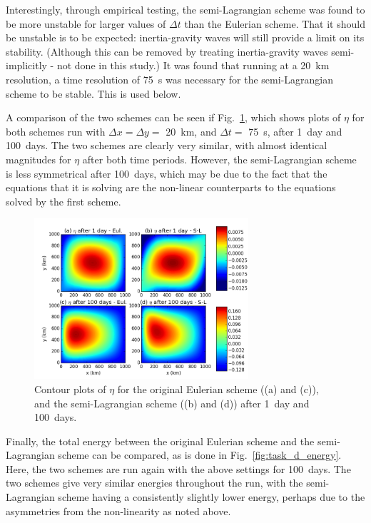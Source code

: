 \documentclass{article}
\begin{document}
Interestingly, through empirical testing, the semi-Lagrangian scheme was found to be more unstable
for larger values of $\Delta t$ than the Eulerian scheme. That it should be unstable is to be
expected: inertia-gravity waves will still provide a limit on its stability. (Although this can be
removed by treating inertia-gravity waves semi-implicitly - not done in this study.) It was found
that running at a \SI{20}{km} resolution, a time resolution of \SI{75}{s} was necessary for the
semi-Lagrangian scheme to be stable. This is used below.

A comparison of the two schemes can be seen if Fig.\ \ref{fig:task_d_eta}, which shows plots of
$\eta$ for both schemes run with $\Delta x = \Delta y = $ \SI{20}{km}, and $\Delta t = $
\SI{75}{s}, after \SI{1}{day} and \SI{100}{days}. The two schemes are clearly very similar, with
almost identical magnitudes for $\eta$ after both time periods. However, the semi-Lagrangian scheme
is less symmetrical after \SI{100}{days}, which may be due to the fact that the equations that it is
solving are the non-linear counterparts to the equations solved by the first scheme.

\begin{figure}[ht!]
    \centering
    \includegraphics[width=300px]{figures/task_d_eta}
    \caption{Contour plots of $\eta$ for the original Eulerian scheme ((a) and (c)), and the
	semi-Lagrangian scheme ((b) and (d)) after \SI{1}{day} and \SI{100}{days}.}
    \label{fig:task_d_eta}
\end{figure}

Finally, the total energy between the original Eulerian scheme and the semi-Lagrangian scheme can be
compared, as is done in Fig.\ \ref{fig:task_d_energy}. Here, the two schemes are run again with the
above settings for \SI{100}{days}. The two schemes give very similar energies throughout the run,
with the semi-Lagrangian scheme having a consistently slightly lower energy, perhaps due to the
asymmetries from the non-linearity as noted above.
\end{document}
